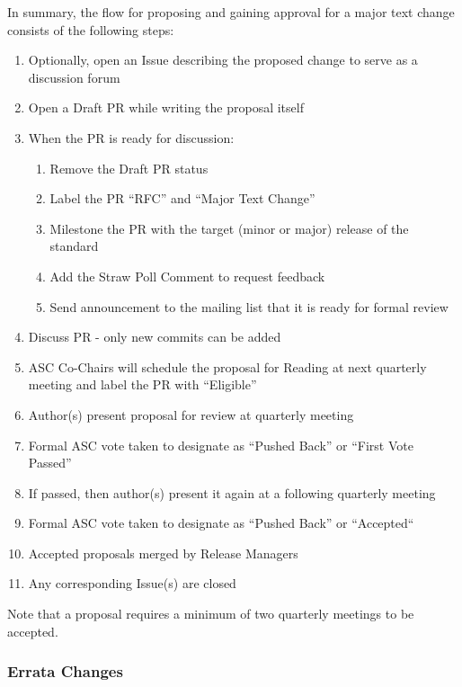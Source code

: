 \documentclass{article}
\providecommand{\tightlist}{%
  \setlength{\itemsep}{0pt}\setlength{\parskip}{0pt}}
\begin{document}
In summary, the flow for proposing and gaining approval for a major text
change consists of the following steps:

\begin{enumerate}
\def\labelenumi{\arabic{enumi}.}
\tightlist
\item
  Optionally, open an Issue describing the proposed change to serve as a discussion
  forum
\item
  Open a Draft PR while writing the proposal itself
\item
  When the PR is ready for discussion:
  \begin{enumerate}
  \def\labelenumi{\arabic{enumi}.}
  \tightlist
  \item 
    Remove the Draft PR status
  \item
    Label the PR ``RFC'' and ``Major Text Change''
  \item
    Milestone the PR with the target (minor or major) release of the standard
  \item
    Add the Straw Poll Comment to request feedback
  \item
    Send announcement to the mailing list that it is ready for formal review
  \end{enumerate}
\item
  Discuss PR - only new commits can be added
\item
  ASC Co-Chairs will schedule the proposal for Reading at next quarterly
  meeting and label the PR with ``Eligible''
\item
  Author(s) present proposal for review at quarterly meeting
\item
  Formal ASC vote taken to designate as ``Pushed Back'' or ``First Vote Passed''
\item
  If passed, then author(s) present it again at a following quarterly meeting
\item
  Formal ASC vote taken to designate as ``Pushed Back'' or ``Accepted``
\item
  Accepted proposals merged by Release Managers
\item
  Any corresponding Issue(s) are closed
\end{enumerate}

Note that a proposal requires a minimum of two quarterly meetings to be
accepted.

\hypertarget{errata-changes}{%
\subsubsection{Errata Changes}%
\label{errata-changes}}
\end{document}
